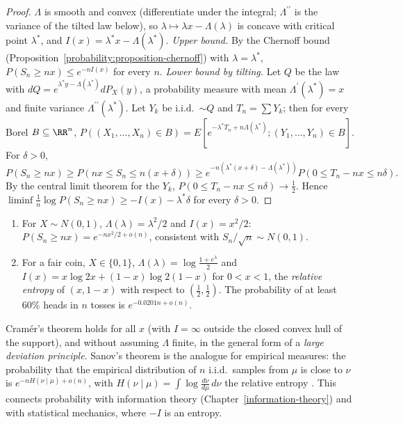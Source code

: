 \begin{proof}
$\Lambda$ is smooth and convex (differentiate under the integral; $\Lambda^{\prime\prime}$ is the variance of the tilted law below), so $\lambda \mapsto \lambda x - \Lambda(\lambda)$ is concave with critical point $\lambda^*$, and
$I(x) = \lambda^*x - \Lambda(\lambda^*)$. \emph{Upper bound.} By the Chernoff bound (Proposition~\ref{probability:proposition-chernoff}) with $\lambda = \lambda^*$, $P(S_n \geq nx) \leq e^{-nI(x)}$ for every $n$.
\emph{Lower bound by tilting.} Let $Q$ be the law with $dQ = e^{\lambda^*y - \Lambda(\lambda^*)}dP_X(y)$, a probability measure with mean $\Lambda^{\prime}(\lambda^*) = x$ and finite variance $\Lambda^{\prime\prime}(\lambda^*)$. Let $Y_k$ be
i.i.d.\ $\sim Q$ and $T_n = \sum Y_k$; then for every Borel $B \subseteq \RR^n$, $P((X_1, \ldots, X_n) \in B) = E[e^{-\lambda^*T_n + n\Lambda(\lambda^*)}; (Y_1, \ldots, Y_n) \in B]$. For $\delta > 0$,
\[
P(S_n \geq nx) \geq P(nx \leq S_n \leq n(x + \delta)) \geq e^{-n(\lambda^*(x + \delta) - \Lambda(\lambda^*))}P(0 \leq T_n - nx \leq n\delta).
\]
By the central limit theorem for the $Y_k$, $P(0 \leq T_n - nx \leq n\delta) \to \frac12$. Hence $\liminf\frac1n\log P(S_n \geq nx) \geq -I(x) - \lambda^*\delta$ for every $\delta > 0$.
\end{proof}

\begin{example}\label{probability:example-cramer}
\begin{enumerate}
\item For $X \sim N(0, 1)$, $\Lambda(\lambda) = \lambda^2/2$ and $I(x) = x^2/2$: $P(S_n \geq nx) = e^{-nx^2/2 + o(n)}$, consistent with $S_n/\sqrt n \sim N(0, 1)$.
\item For a fair coin, $X \in \{0, 1\}$, $\Lambda(\lambda) = \log\frac{1 + e^\lambda}{2}$ and $I(x) = x\log 2x + (1 - x)\log 2(1 - x)$ for $0 < x < 1$, the \emph{relative entropy} of $(x, 1 - x)$ with respect to $(\frac12, \frac12)$. The
probability of at least $60\%$ heads in $n$ tosses is $e^{-0.0201n + o(n)}$.
\end{enumerate}
\end{example}

\begin{remark}\label{probability:remark-sanov}
Cram\'er's theorem holds for all $x$ (with $I = \infty$ outside the closed convex hull of the support), and without assuming $\Lambda$ finite, in the general form of a \emph{large deviation principle}. Sanov's theorem is
the analogue for empirical measures: the probability that the empirical distribution of $n$ i.i.d.\ samples from $\mu$ is close to $\nu$ is $e^{-nH(\nu \mid \mu) + o(n)}$, with $H(\nu \mid \mu) = \int\log\frac{d\nu}{d\mu}\,d\nu$ the
relative entropy \cite{dembo-zeitouni}. This connects probability with information theory (Chapter~\ref{information-theory}) and with statistical mechanics, where $-I$ is an entropy.
\end{remark}

